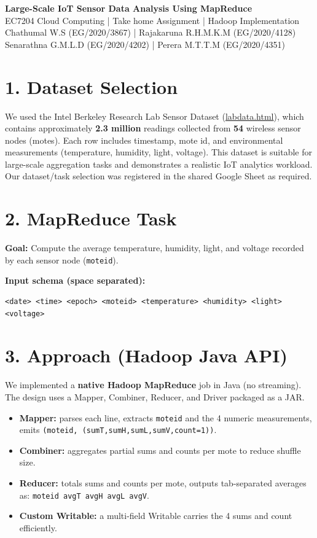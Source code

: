 \documentclass[12pt,a4paper]{article}
\begin{document}
\begin{center}
{\LARGE\textbf{Large-Scale IoT Sensor Data Analysis Using MapReduce}}\\[10pt]
{\large EC7204 Cloud Computing | Take home Assignment | Hadoop Implementation}\\[6pt]
{\normalsize Chathumal W.S (EG/2020/3867) | Rajakaruna R.H.M.K.M (EG/2020/4128)}\\[2pt]
{\normalsize Senarathna G.M.L.D (EG/2020/4202) | Perera M.T.T.M (EG/2020/4351)}\\[10pt]
\end{center}

\section*{1. Dataset Selection}
We used the Intel Berkeley Research Lab Sensor Dataset (\href{https://db.csail.mit.edu/labdata/labdata.html}{labdata.html}), which contains approximately \textbf{2.3 million} readings collected from \textbf{54} wireless sensor nodes (motes). Each row includes timestamp, mote id, and environmental measurements (temperature, humidity, light, voltage). This dataset is suitable for large-scale aggregation tasks and demonstrates a realistic IoT analytics workload. Our dataset/task selection was registered in the shared Google Sheet as required.

\section*{2. MapReduce Task}
\textbf{Goal:} Compute the average temperature, humidity, light, and voltage recorded by each sensor node (\texttt{moteid}).

\textbf{Input schema (space separated):}
\begin{lstlisting}
<date> <time> <epoch> <moteid> <temperature> <humidity> <light> <voltage>
\end{lstlisting}

\section*{3. Approach (Hadoop Java API)}
We implemented a \textbf{native Hadoop MapReduce} job in Java (no streaming). The design uses a Mapper, Combiner, Reducer, and Driver packaged as a JAR.

\begin{itemize}
  \item \textbf{Mapper:} parses each line, extracts \texttt{moteid} and the 4 numeric measurements, emits \texttt{(moteid, (sumT,sumH,sumL,sumV,count=1))}.
  \item \textbf{Combiner:} aggregates partial sums and counts per mote to reduce shuffle size.
  \item \textbf{Reducer:} totals sums and counts per mote, outputs tab-separated averages as: \texttt{moteid  avgT  avgH  avgL  avgV}.
  \item \textbf{Custom Writable:} a multi-field Writable carries the 4 sums and count efficiently.
\end{itemize}
\end{document}
